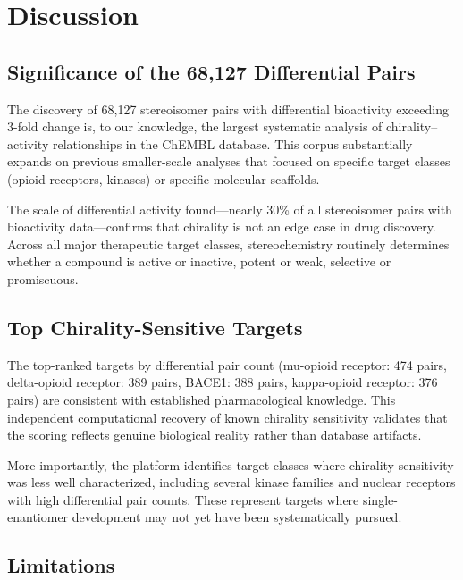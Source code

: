 \documentclass[11pt,a4paper]{article}
\begin{document}
\newpage

\section{Discussion}
\label{sec:discussion}

\subsection{Significance of the 68,127 Differential Pairs}

The discovery of 68,127 stereoisomer pairs with differential bioactivity
exceeding 3-fold change is, to our knowledge, the largest systematic analysis
of chirality--activity relationships in the ChEMBL database. This corpus
substantially expands on previous smaller-scale analyses that focused on
specific target classes (opioid receptors, kinases) or specific molecular
scaffolds.

The scale of differential activity found---nearly 30\% of all stereoisomer
pairs with bioactivity data---confirms that chirality is not an edge case in
drug discovery. Across all major therapeutic target classes, stereochemistry
routinely determines whether a compound is active or inactive, potent or weak,
selective or promiscuous.

\subsection{Top Chirality-Sensitive Targets}

The top-ranked targets by differential pair count (mu-opioid receptor: 474 pairs,
delta-opioid receptor: 389 pairs, BACE1: 388 pairs, kappa-opioid receptor: 376
pairs) are consistent with established pharmacological knowledge. This
independent computational recovery of known chirality sensitivity validates
that the scoring reflects genuine biological reality rather than database
artifacts.

More importantly, the platform identifies target classes where chirality
sensitivity was less well characterized, including several kinase families and
nuclear receptors with high differential pair counts. These represent targets
where single-enantiomer development may not yet have been systematically pursued.

\subsection{Limitations}
\end{document}
